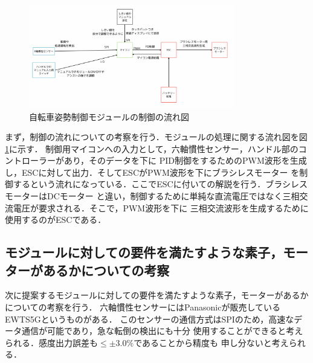 \documentclass[uplatex,dvipdfmx]{jsarticle}
\begin{document}
\begin{figure}[H]
    \centering
    \includegraphics[width=0.8\textwidth]{fig/nagare.png}
    \caption{自転車姿勢制御モジュールの制御の流れ図}
    \label{fig:nagare}
\end{figure}
まず，制御の流れについての考察を行う．モジュールの処理に関する流れ図を図\ref{fig:nagare}に示す．
制御用マイコンへの入力として，六軸慣性センサー，ハンドル部のコントローラーがあり，そのデータを下に
PID制御をするためのPWM波形を生成し，ESCに対して出力．そしてESCがPWM波形を下にブラシレスモーター
を制御するという流れになっている．ここでESCに付いての解説を行う．ブラシレスモーターはDCモーター
と違い，制御するために単純な直流電圧ではなく三相交流電圧が要求される．そこで，PWM波形を下に
三相交流波形を生成するために使用するのがESCである．

\subsection{モジュールに対しての要件を満たすような素子，モーターがあるかについての考察}


次に提案するモジュールに対しての要件を満たすような素子，モーターがあるかについての考察を行う．
六軸慣性センサーにはPanasonicが販売しているEWTS5Gというものがある\cite{tandokuWariai}．
このセンサーの通信方式はSPIのため，高速なデータ通信が可能であり，急な転倒の検出にも十分
使用することができると考えられる．感度出力誤差も$\leq \pm 3.0\%$であることから精度も
申し分ないと考えられる．
\end{document}
